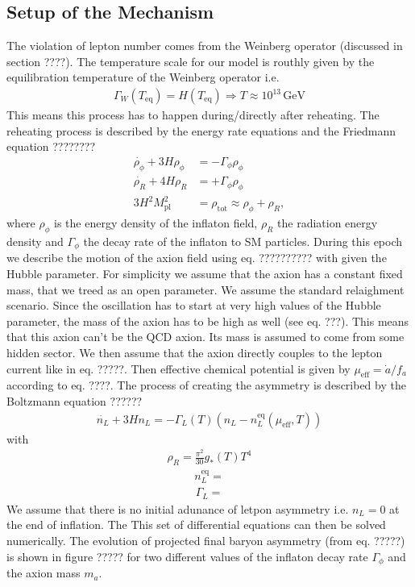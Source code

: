 \documentclass[13pt,a4paper,twoside,titlepage]{article}
\begin{document}
\subsection{Setup of the Mechanism}
The violation of lepton number comes from the Weinberg operator (discussed in section ????).
The temperature scale for our model is routhly given by the equilibration temperature of the Weinberg operator i.e.
\begin{align}
    \Gamma_W(T_\mathrm{eq}) = H(T_\mathrm{eq}) \Rightarrow T \approx 10^{13} \, \mathrm{GeV}
\end{align}
This means this process has to happen during/directly after reheating. The reheating process is described by the energy rate equations and the Friedmann equation ????????
\begin{align}
    \dot{\rho_\phi} + 3 H \rho_\phi &= - \Gamma_\phi \rho_\phi \\
    \dot{\rho_R} + 4 H \rho_R &= + \Gamma_\phi \rho_\phi \\
    3 H^2 M_\mathrm{pl}^2 &= \rho_\mathrm{tot} \approx \rho_\phi + \rho_R,
\end{align}
where $\rho_\phi$ is the energy density of the inflaton field, $\rho_R$ the radiation energy density and $\Gamma_\phi$ the decay rate of the inflaton to SM particles.
During this epoch we describe the motion of the axion field using eq. ?????????? with given the Hubble parameter.
For simplicity we assume that the axion has a constant fixed mass, that we treed as an open parameter. We assume the standard relaighment scenario. Since the oscillation has to start at very high values of the Hubble parameter, the mass of the axion has to be high as well (see eq. ???).
This means that this axion can't be the QCD axion. Its mass is assumed to come from some hidden sector.
We then assume that the axion directly couples to the lepton current like in eq. ?????. Then effective chemical potential is given by $\mu_\mathrm{eff} = \dot{a}/f_a$ according to eq. ????.
The process of creating the asymmetry is described by the Boltzmann equation ??????
\begin{align}
    \dot{n_L} + 3 H n_L = - \Gamma_L(T) (n_L - n_L^\mathrm{eq}(\mu_\mathrm{eff}, T))
\end{align}
with
\begin{align}
    \rho_R = \frac{\pi^2}{30} g_{*}(T) T^4
\end{align}
\begin{align}
    n_L^\mathrm{eq} =
\end{align}
\begin{align}
    \Gamma_L =
\end{align}
We assume that there is no initial adunance of letpon asymmetry i.e. $n_L = 0$ at the end of inflation.
The
This set of differential equations can then be solved numerically. The evolution of projected final baryon asymmetry (from eq. ?????) is shown in figure ????? for two different values of the inflaton decay rate $\Gamma_\phi$ and the axion mass $m_a$.
\end{document}
